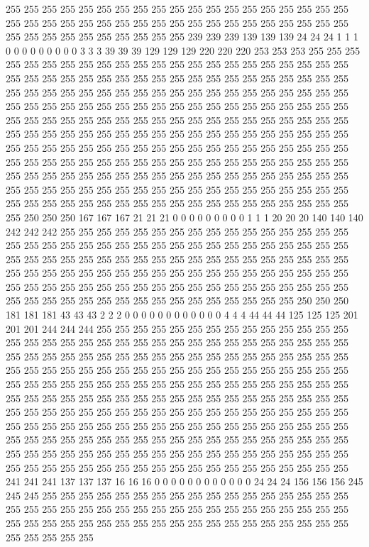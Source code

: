 255 255 255 255 255 255 255 255 255 255 255 255 255 255 255 255 255 255 255 255 255 255 255 255 255 255 255 255 255 255 255 255 255 255 255 255 255 255 255 255 255 255 255 255 255 255 255 255 239 239 239 139 139 139 24 24 24 1 1 1 0 0 0 0 0 0 0 0 0 3 3 3 39 39 39 129 129 129 220 220 220 253 253 253 255 255 255 255 255 255 255 255 255 255 255 255 255 255 255 255 255 255 255 255 255 255 255 255 255 255 255 255 255 255 255 255 255 255 255 255 255 255 255 255 255 255 255 255 
255 255 255 255 255 255 255 255 255 255 255 255 255 255 255 255 255 255 255 255 255 255 255 255 255 255 255 255 255 255 255 255 255 255 255 255 255 255 255 255 255 255 255 255 255 255 255 255 255 255 255 255 255 255 255 255 255 255 255 255 255 255 255 255 255 255 255 255 255 255 255 255 255 255 255 255 255 255 255 255 255 255 255 255 255 255 255 255 255 255 255 255 255 255 255 255 255 255 255 255 255 255 255 255 255 255 255 255 255 255 255 255 255 255 255 255 255 255 255 255 255 255 255 255 255 255 255 255 
255 255 255 255 255 255 255 255 255 255 255 255 255 255 255 255 255 255 255 255 255 255 255 255 255 255 255 255 255 255 255 255 255 255 255 255 255 255 255 255 255 250 250 250 167 167 167 21 21 21 0 0 0 0 0 0 0 0 0 1 1 1 20 20 20 140 140 140 242 242 242 255 255 255 255 255 255 255 255 255 255 255 255 255 255 255 255 255 255 255 255 255 255 255 255 255 255 255 255 255 255 255 255 255 255 255 255 255 255 255 255 255 255 255 255 255 255 255 255 255 255 255 255 255 255 255 255 255 
255 255 255 255 255 255 255 255 255 255 255 255 255 255 255 255 255 255 255 255 255 255 255 255 255 255 255 255 255 255 255 255 255 255 255 255 255 255 255 255 255 255 255 255 255 255 255 255 255 255 255 250 250 250 181 181 181 43 43 43 2 2 2 0 0 0 0 0 0 0 0 0 0 0 0 4 4 4 44 44 44 125 125 125 201 201 201 244 244 244 255 255 255 255 255 255 255 255 255 255 255 255 255 255 255 255 255 255 255 255 255 255 255 255 255 255 255 255 255 255 255 255 255 255 255 255 255 255 
255 255 255 255 255 255 255 255 255 255 255 255 255 255 255 255 255 255 255 255 255 255 255 255 255 255 255 255 255 255 255 255 255 255 255 255 255 255 255 255 255 255 255 255 255 255 255 255 255 255 255 255 255 255 255 255 255 255 255 255 255 255 255 255 255 255 255 255 255 255 255 255 255 255 255 255 255 255 255 255 255 255 255 255 255 255 255 255 255 255 255 255 255 255 255 255 255 255 255 255 255 255 255 255 255 255 255 255 255 255 255 255 255 255 255 255 255 255 255 255 255 255 255 255 255 255 255 255 
255 255 255 255 255 255 255 255 255 255 255 255 255 255 255 255 255 255 255 255 255 255 255 255 255 255 255 255 255 255 255 255 255 255 255 255 255 255 241 241 241 137 137 137 16 16 16 0 0 0 0 0 0 0 0 0 0 0 0 24 24 24 156 156 156 245 245 245 255 255 255 255 255 255 255 255 255 255 255 255 255 255 255 255 255 255 255 255 255 255 255 255 255 255 255 255 255 255 255 255 255 255 255 255 255 255 255 255 255 255 255 255 255 255 255 255 255 255 255 255 255 255 255 255 255 255 255 255 
